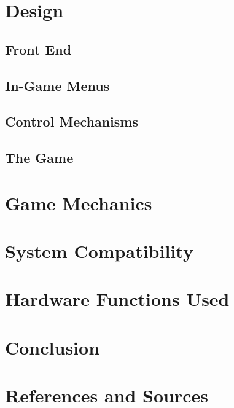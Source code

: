 \documentclass{article}
\begin{document}
\clearpage
\section{Design}
\subsection{Front End}
\subsection{In-Game Menus}
\subsection{Control Mechanisms}
\subsection{The Game}
\section{Game Mechanics}
\section{System Compatibility}
\section{Hardware Functions Used}
\section{Conclusion}
\section{References and Sources}


 
\end{document}
